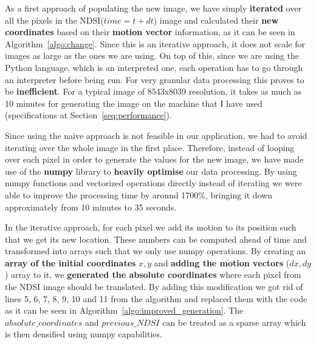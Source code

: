 \documentclass[12pt, a4paper]{report}
\begin{document}
	\par As a first approach of populating the new image, we have simply \textbf{iterated} over all the pixels in the NDSI(\(time=t+dt\)) image and calculated their \textbf{new coordinates} based on their \textbf{motion vector} information, as it can be seen in Algorithm~\ref{algo:change}. Since this is an iterative approach, it does not scale for images as large as the ones we are using. On top of this, since we are using the Python language, which is an interpreted one, each operation has to go through an interpreter before being run. For very granular data processing this proves to be \textbf{inefficient}. For a typical image of 8543x8039 resolution, it takes as much as 10 minutes for generating the image on the machine that I have used (specifications at Section~\ref{seq:performance}).
	
	\par Since using the naive approach is not feasible in our application, we had to avoid iterating over the whole image in the first place. Therefore, instead of looping over each pixel in order to generate the values for the new image, we have made use of the \textbf{numpy} library to \textbf{heavily optimise} our data processing. By using numpy functions and vectorized operations directly instead of iterating we were able to improve the processing time by around 1700\%, bringing it down approximately from 10 minutes to 35 seconds.
	
	\par In the iterative approach, for each pixel we add its motion to its position such that we get its new location. These numbers can be computed ahead of time and transformed into arrays such that we only use numpy operations. By creating an \textbf{array of the initial coordinates} \(x, y\) and \textbf{adding the motion vectors} (\(dx, dy\)) array to it, we \textbf{generated the absolute coordinates} where each pixel from the NDSI image should be translated. By adding this modification we got rid of lines 5, 6, 7, 8, 9, 10 and 11 from the algorithm and replaced them with the code as it can be seen in Algorithm~\ref{algo:improved_generation}. The \(absolute\_coordinates\) and \(previous\_NDSI\) can be treated as a sparse array which is then densified using numpy capabilities.
\end{document}
